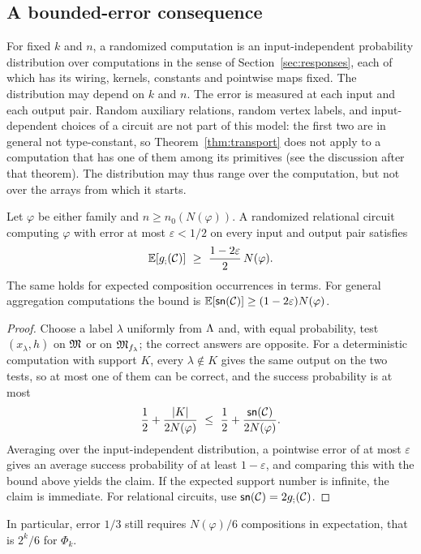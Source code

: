\subsection{A bounded-error consequence}
For fixed $k$ and $n$, a randomized computation is an input-independent
probability distribution over computations in the sense of
Section~\ref{sec:responses}, each of which has its wiring, kernels,
constants and pointwise maps fixed. The distribution may depend on $k$ and
$n$. The error is measured at each input and each output pair. Random
auxiliary relations, random vertex labels, and input-dependent choices of a
circuit are not part of this model: the first two are in general not
type-constant, so Theorem~\ref{thm:transport} does not apply to a
computation that has one of them among its primitives (see the discussion
after that theorem). The distribution may thus range over the computation,
but not over the arrays from which it starts.

\begin{corollary}\label{cor:randomized}
Let $\varphi$ be either family and $n\ge n_0(N(\varphi))$. A randomized
relational circuit computing $\varphi$ with error at most $\varepsilon<1/2$
on every input and output pair satisfies
\[
 \mathbb E[\gcost{\Comp}]\ \ge\ \frac{1-2\varepsilon}{2}\,N(\varphi).
\]
The same holds for expected composition occurrences in terms. For general
aggregation computations the bound is
$\mathbb E[\mathsf{sn}(\mathcal C)]\ge(1-2\varepsilon)N(\varphi)$.
\end{corollary}
\begin{proof}
Choose a label $\lambda$ uniformly from $\Lambda$ and, with equal
probability, test $(x_\lambda,h)$ on $\mathfrak M$ or on $\mathfrak M_{f_\lambda}$; the
correct answers are opposite. For a deterministic computation with support
$K$, every $\lambda\notin K$ gives the same output on the two tests, so at
most one of them can be correct, and the success probability is at most
\[
 \frac12+\frac{|K|}{2N(\varphi)}
 \ \le\ \frac12+\frac{\mathsf{sn}(\mathcal C)}{2N(\varphi)}.
\]
Averaging over the input-independent distribution, a pointwise error of at
most $\varepsilon$ gives an average success probability of at least
$1-\varepsilon$, and comparing this with the bound above yields the claim.
If the expected support number is infinite, the claim is immediate. For
relational circuits, use $\mathsf{sn}(\mathcal C)=2g_{;}(\mathcal C)$.
\end{proof}
In particular, error $1/3$ still requires $N(\varphi)/6$ compositions in
expectation, that is $2^k/6$ for $\Phi_k$.
